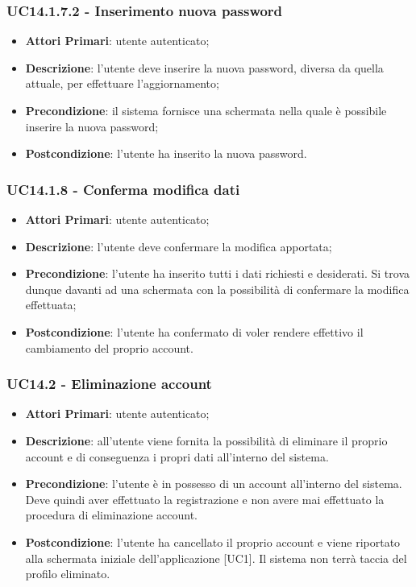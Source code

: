 \subsubsection{UC14.1.7.2 - Inserimento nuova password}
\begin{itemize}
	\item \textbf{Attori Primari}: utente autenticato;
	\item \textbf{Descrizione}: l'utente deve inserire la nuova password, diversa da quella attuale, per effettuare l'aggiornamento;
	\item \textbf{Precondizione}: il sistema fornisce una schermata nella quale è possibile inserire la nuova password;
	\item \textbf{Postcondizione}: l'utente ha inserito la nuova password.
\end{itemize}

\subsubsection{UC14.1.8 - Conferma modifica dati}
\begin{itemize}
	\item \textbf{Attori Primari}: utente autenticato;
	\item \textbf{Descrizione}: l'utente deve 
	confermare la modifica apportata;
	\item \textbf{Precondizione}: l'utente ha inserito tutti i dati richiesti e desiderati. Si trova dunque davanti ad una schermata con la possibilità di confermare la modifica effettuata;
	\item \textbf{Postcondizione}: l'utente ha confermato di voler rendere effettivo il cambiamento del proprio account.
\end{itemize}

\subsubsection{UC14.2 - Eliminazione account}
\begin{itemize}
	\item \textbf{Attori Primari}: utente autenticato;
	\item \textbf{Descrizione}: all'utente viene fornita la possibilità di eliminare il proprio account e di conseguenza i propri dati all'interno del sistema.
	\item \textbf{Precondizione}: l'utente è in possesso di un account all'interno del sistema. Deve quindi aver effettuato la registrazione e non avere mai effettuato la procedura di eliminazione account.
	\item \textbf{Postcondizione}: l'utente ha cancellato il proprio account e viene riportato alla schermata iniziale dell'applicazione [UC1]. Il sistema non terrà taccia del profilo eliminato.
\end{itemize}

